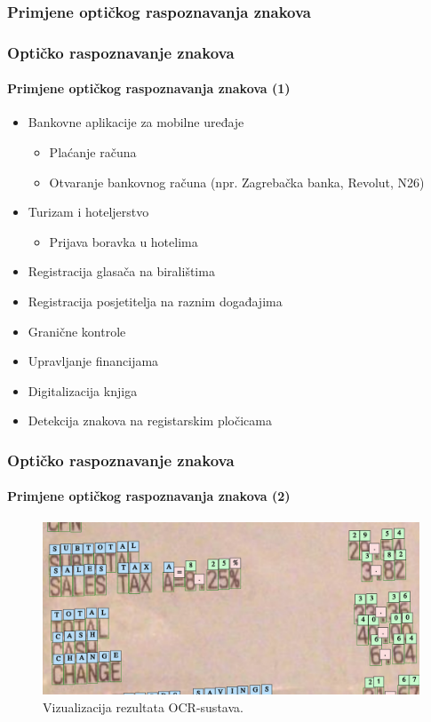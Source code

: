 \documentclass{beamer}
\begin{document}
\subsubsection{Primjene optičkog raspoznavanja znakova}
\begin{frame}
\frametitle{Optičko raspoznavanje znakova}
\framesubtitle{Primjene optičkog raspoznavanja znakova (1)}
\begin{itemize}
    \item Bankovne aplikacije za mobilne uređaje
    \begin{itemize}
        \item Plaćanje računa
        \item Otvaranje bankovnog računa (npr. Zagrebačka banka, Revolut, N26)
    \end{itemize}
    \item Turizam i hoteljerstvo
    \begin{itemize}
        \item Prijava boravka u hotelima
    \end{itemize}
    \item Registracija glasača na biralištima
    \item Registracija posjetitelja na raznim događajima
    \item Granične kontrole
    \item Upravljanje financijama
    \item Digitalizacija knjiga
    \item Detekcija znakova na registarskim pločicama
\end{itemize}
\end{frame}

\begin{frame}
\frametitle{Optičko raspoznavanje znakova}
\framesubtitle{Primjene optičkog raspoznavanja znakova (2)}
\begin{figure}[htb]
    \centering
    \includegraphics[width=12cm]{images/receipt-example-01.png}
    \caption{Vizualizacija rezultata OCR-sustava.}
    \label{fig:ocr-result-01}
\end{figure}
\end{frame}
\end{document}
